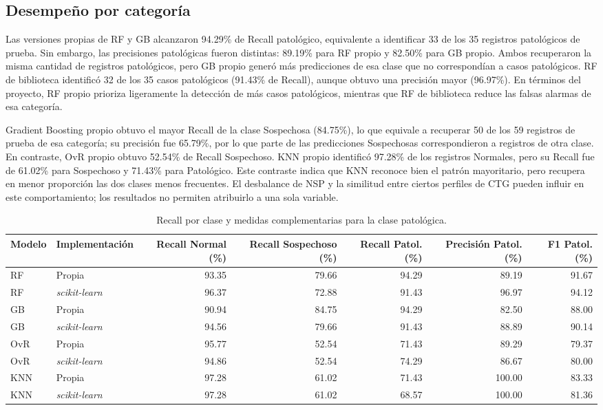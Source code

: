 \subsection{Desempe\~no por categor\'ia}
Las versiones propias de RF y GB alcanzaron 94.29\% de Recall patol\'ogico, equivalente a identificar 33 de los 35 registros patol\'ogicos de prueba. Sin embargo, las precisiones patol\'ogicas fueron distintas: 89.19\% para RF propio y 82.50\% para GB propio. Ambos recuperaron la misma cantidad de registros patol\'ogicos, pero GB propio gener\'o m\'as predicciones de esa clase que no correspond\'ian a casos patol\'ogicos. RF de biblioteca identific\'o 32 de los 35 casos patol\'ogicos (91.43\% de Recall), aunque obtuvo una precisi\'on mayor (96.97\%). En t\'erminos del proyecto, RF propio prioriza ligeramente la detecci\'on de m\'as casos patol\'ogicos, mientras que RF de biblioteca reduce las falsas alarmas de esa categor\'ia.

Gradient Boosting propio obtuvo el mayor Recall de la clase Sospechosa (84.75\%), lo que equivale a recuperar 50 de los 59 registros de prueba de esa categor\'ia; su precisi\'on fue 65.79\%, por lo que parte de las predicciones Sospechosas correspondieron a registros de otra clase. En contraste, OvR propio obtuvo 52.54\% de Recall Sospechoso. KNN propio identific\'o 97.28\% de los registros Normales, pero su Recall fue de 61.02\% para Sospechoso y 71.43\% para Patol\'ogico. Este contraste indica que KNN reconoce bien el patr\'on mayoritario, pero recupera en menor proporci\'on las dos clases menos frecuentes. El desbalance de NSP y la similitud entre ciertos perfiles de CTG pueden influir en este comportamiento; los resultados no permiten atribuirlo a una sola variable.

\begin{table}[t]
\centering
\caption{Recall por clase y medidas complementarias para la clase patol\'ogica.}
\label{tab:recallclase}
\scriptsize
\begin{tabular}{llrrrrr}
\toprule
Modelo & Implementaci\'on & Recall Normal (\%) & Recall Sospechoso (\%) & Recall Patol. (\%) & Precisi\'on Patol. (\%) & F1 Patol. (\%) \\
\midrule
RF & Propia & 93.35 & 79.66 & 94.29 & 89.19 & 91.67 \\
RF & \textit{scikit-learn} & 96.37 & 72.88 & 91.43 & 96.97 & 94.12 \\
GB & Propia & 90.94 & 84.75 & 94.29 & 82.50 & 88.00 \\
GB & \textit{scikit-learn} & 94.56 & 79.66 & 91.43 & 88.89 & 90.14 \\
OvR & Propia & 95.77 & 52.54 & 71.43 & 89.29 & 79.37 \\
OvR & \textit{scikit-learn} & 94.86 & 52.54 & 74.29 & 86.67 & 80.00 \\
KNN & Propia & 97.28 & 61.02 & 71.43 & 100.00 & 83.33 \\
KNN & \textit{scikit-learn} & 97.28 & 61.02 & 68.57 & 100.00 & 81.36 \\
\bottomrule
\end{tabular}
\end{table}

